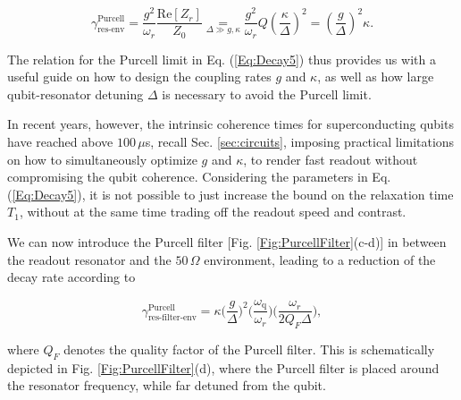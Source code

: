 \documentclass[aip,apr,twocolumn,showpacs,superscriptaddress,groupedaddress,nofootinbib,reprint]{revtex4-1}  %
\newcommand{\freq}{\omega_\text{q}}
\begin{document}
\begin{equation}
\gamma^{\text{Purcell}}_{\text{res-env}} = \frac{g^2}{\omega_{r}}\frac{\mbox{Re}[Z_r]}{Z_0} \underset{\Delta\gg g,\kappa}{=} \frac{g^2}{\omega_{r}}Q \left(\frac{\kappa}{\Delta}\right)^2 = \left(\frac{g}{\Delta}\right)^2\kappa.
\label{Eq:Decay5}
\end{equation}

The relation for the Purcell limit in Eq. (\ref{Eq:Decay5}) thus provides us with a useful guide on how to design the coupling rates $g$ and $\kappa$, as well as how large qubit-resonator detuning $\Delta$ is necessary to avoid the Purcell limit.

In recent years, however, the intrinsic coherence times for superconducting qubits have reached above $100\,\mu$s, recall Sec. \ref{sec:circuits}, imposing practical limitations on how to simultaneously optimize $g$ and $\kappa$, to render fast readout without compromising the qubit coherence. Considering the parameters in Eq. (\ref{Eq:Decay5}), it is not possible to just increase the bound on the relaxation time $T_1$, without at the same time trading off the readout speed and contrast.


We can now introduce the Purcell filter [Fig. \ref{Fig:PurcellFilter}(c-d)] in between the readout resonator and the $50\,\Omega$ environment, leading to a reduction of the decay rate according to\cite{Reed2010a}

\begin{equation}
\gamma^{\text{Purcell}}_{\text{res-filter-env}} = \kappa\bigg(\frac{g}{\Delta}\bigg)^2 \bigg( \frac{\freq}{\omega_r}\bigg)\bigg(\frac{\omega_r}{2Q_F\Delta}\bigg),
\label{Eq:Purcell}
\end{equation}

\noindent where $Q_F$ denotes the quality factor of the Purcell filter. This is schematically depicted in Fig. \ref{Fig:PurcellFilter}(d), where the Purcell filter is placed around the resonator frequency, while far detuned from the qubit.
\end{document}
